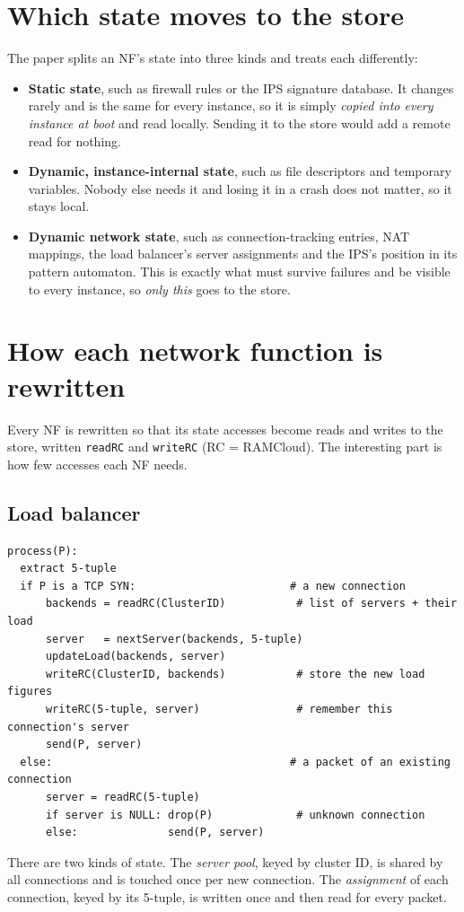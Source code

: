 \section{Which state moves to the store}

The paper splits an NF's state into three kinds and treats each differently:
\begin{itemize}
  \item \textbf{Static state}, such as firewall rules or the IPS signature database. It changes rarely and is the same for every instance, so it
        is simply \emph{copied into every instance at boot} and read locally. Sending it to the store would add a remote read for nothing.
  \item \textbf{Dynamic, instance-internal state}, such as file descriptors and temporary variables. Nobody else needs it and losing it in a
        crash does not matter, so it stays local.
  \item \textbf{Dynamic network state}, such as connection-tracking entries, NAT mappings, the load balancer's server assignments and the IPS's position
        in its pattern automaton. This is exactly what must survive failures and be visible to every instance, so \emph{only this} goes to
        the store.
\end{itemize}

\section{How each network function is rewritten}

Every NF is rewritten so that its state accesses become reads and writes to the store, written \texttt{readRC} and
\texttt{writeRC} (RC = RAMCloud). The interesting part is how few accesses each NF needs.

\subsection{Load balancer}
\begin{lstlisting}
process(P):
  extract 5-tuple
  if P is a TCP SYN:                        # a new connection
      backends = readRC(ClusterID)           # list of servers + their load
      server   = nextServer(backends, 5-tuple)
      updateLoad(backends, server)
      writeRC(ClusterID, backends)           # store the new load figures
      writeRC(5-tuple, server)               # remember this connection's server
      send(P, server)
  else:                                     # a packet of an existing connection
      server = readRC(5-tuple)
      if server is NULL: drop(P)             # unknown connection
      else:              send(P, server)
\end{lstlisting}
There are two kinds of state. The \emph{server pool}, keyed by cluster ID, is shared by all connections and is touched once per
new connection. The \emph{assignment} of each connection, keyed by its 5-tuple, is written once and then read for every packet.

